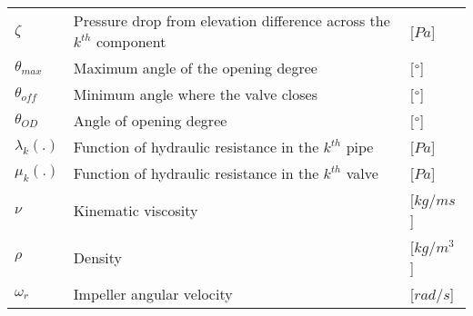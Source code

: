 \begin{tabular}{l l l}
	$\zeta$			&	Pressure drop from elevation difference across the $k^{th}$ component	& [$Pa$]\\
	$\theta_{max}$	&	Maximum angle of the opening degree						    & [$\degree$]\\
	$\theta_{off}$	&	Minimum angle where the valve closes						& [$\degree$]\\
	$\theta_{OD}$	&	Angle of opening degree										& [$\degree$]\\
	$\lambda_k(.)$	&	Function of hydraulic resistance in the $k^{th}$ pipe		& [$Pa$]\\
	$\mu_k(.)$		&	Function of hydraulic resistance in the $k^{th}$ valve		& [$Pa$]\\
	$\nu$			&	Kinematic viscosity									     	& [$kg/ms$]\\
	$\rho$			&	Density									     				& [$kg/m^3$]\\
	$\omega_r$		&	Impeller angular velocity									& [$rad/s$]\\
	
\end{tabular}

